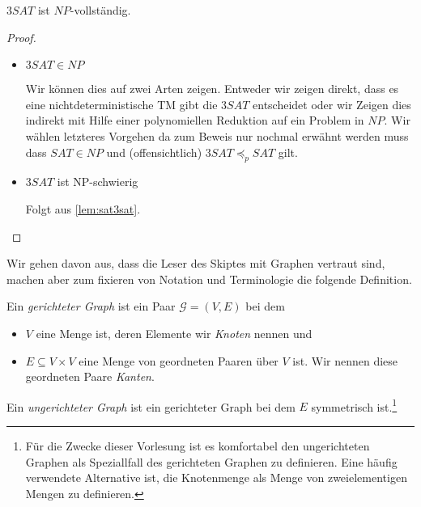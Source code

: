 \begin{Satz}[name={[$3SAT$ ist $NP$-vollständig]}]
	$3SAT$ ist $NP$-vollständig.
\end{Satz}
\begin{proof}
 \begin{itemize}
  \item $3SAT\in NP$
  
  Wir können dies auf zwei Arten zeigen. 
  Entweder wir zeigen direkt, dass es eine nichtdeterministische \ac{TM} gibt die $3SAT$ entscheidet oder 
  wir Zeigen dies indirekt mit Hilfe einer polynomiellen Reduktion auf ein Problem in $NP$.
  Wir wählen letzteres Vorgehen da zum Beweis nur nochmal erwähnt werden muss dass $SAT\in NP$ und (offensichtlich) $3SAT\preceq_p SAT$ gilt.
  
  \item $3SAT$ ist NP-schwierig
  
  Folgt aus \autoref{lem:sat3sat}.\qedhere
 \end{itemize}
\end{proof}


Wir gehen davon aus, dass die Leser des Skiptes mit Graphen vertraut sind, machen aber zum fixieren von Notation und Terminologie die folgende Definition.
\begin{Def}
 Ein \emph{gerichteter Graph} ist ein Paar $\mathcal{G}=(V,E)$ bei dem 
 \begin{itemize}
  \item $V$ eine Menge ist, deren Elemente wir \emph{Knoten} nennen und
  \item $E\subseteq V\times V$ eine Menge von geordneten Paaren über $V$ ist. 
  Wir nennen diese geordneten Paare \emph{Kanten}.
 \end{itemize}
 Ein \emph{ungerichteter Graph} ist ein gerichteter Graph bei dem $E$ symmetrisch ist.\footnote{Für die Zwecke dieser Vorlesung ist es komfortabel den ungerichteten Graphen als Speziallfall des gerichteten Graphen zu definieren. Eine häufig verwendete Alternative ist, die Knotenmenge als Menge von zweielementigen Mengen zu definieren.}
\end{Def}



